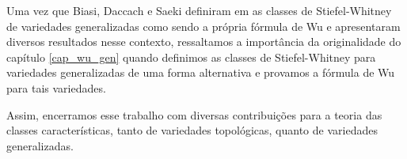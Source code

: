\documentclass[12pt,oneside]{book} %
\begin{document}
\par Uma vez que Biasi, Daccach e Saeki definiram em \cite{biasi} as classes de Stiefel-Whitney de variedades generalizadas como sendo a própria fórmula de Wu e apresentaram diversos resultados nesse contexto, ressaltamos a importância da originalidade do capítulo \ref{cap_wu_gen} quando definimos as classes de Stiefel-Whitney para variedades generalizadas de uma forma alternativa e provamos a fórmula de Wu para tais variedades.

\par Assim, encerramos esse trabalho com diversas contribuições para a teoria das classes características, tanto de variedades topológicas, quanto de variedades generalizadas.





\end{document}
